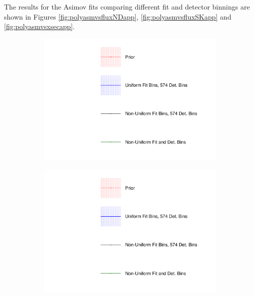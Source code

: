 The results for the Asimov fits comparing different fit and detector binnings are shown in Figures \ref{fig:polyasmvsfluxNDapp}, \ref{fig:polyasmvsfluxSKapp} and \ref{fig:polyasmvsxsecapp}.

\begin{figure}[!htbp]
\centering
\begin{subfigure}{0.3\textwidth}
  \centering
  \includegraphics[width=1.0\linewidth,  trim={5mm  80mm 0mm 0mm}, clip]{figs/polyasmvs_leg}
\end{subfigure}
\begin{subfigure}{0.3\textwidth}
  \centering
  \includegraphics[width=1.0\linewidth,  trim={5mm  0mm 0mm 95mm}, clip]{figs/polyasmvs_leg}
\end{subfigure}
\begin{subfigure}{0.45\textwidth}

\end{subfigure}
\end{figure}
